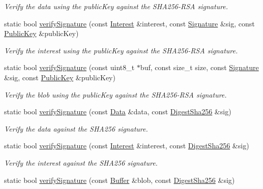 \begin{DoxyCompactItemize}
\begin{DoxyCompactList}\small\item\em Verify the data using the public\+Key against the S\+H\+A256-\/\+R\+SA signature. \end{DoxyCompactList}\item 
static bool \hyperlink{classndn_1_1Validator_a5faa99e68ab831c746ce0c2a2e239d80}{verify\+Signature} (const \hyperlink{classndn_1_1Interest}{Interest} \&interest, const \hyperlink{classndn_1_1Signature}{Signature} \&sig, const \hyperlink{classndn_1_1PublicKey}{Public\+Key} \&public\+Key)
\begin{DoxyCompactList}\small\item\em Verify the interest using the public\+Key against the S\+H\+A256-\/\+R\+SA signature. \end{DoxyCompactList}\item 
static bool \hyperlink{classndn_1_1Validator_a302755201b396a2454dd51099dd795a2}{verify\+Signature} (const uint8\+\_\+t $\ast$buf, const size\+\_\+t size, const \hyperlink{classndn_1_1Signature}{Signature} \&sig, const \hyperlink{classndn_1_1PublicKey}{Public\+Key} \&public\+Key)\hypertarget{classndn_1_1Validator_a302755201b396a2454dd51099dd795a2}{}\label{classndn_1_1Validator_a302755201b396a2454dd51099dd795a2}

\begin{DoxyCompactList}\small\item\em Verify the blob using the public\+Key against the S\+H\+A256-\/\+R\+SA signature. \end{DoxyCompactList}\item 
static bool \hyperlink{classndn_1_1Validator_a8fcd7839e9f422f891a813c7e2592f23}{verify\+Signature} (const \hyperlink{classndn_1_1Data}{Data} \&data, const \hyperlink{classndn_1_1DigestSha256}{Digest\+Sha256} \&sig)\hypertarget{classndn_1_1Validator_a8fcd7839e9f422f891a813c7e2592f23}{}\label{classndn_1_1Validator_a8fcd7839e9f422f891a813c7e2592f23}

\begin{DoxyCompactList}\small\item\em Verify the data against the S\+H\+A256 signature. \end{DoxyCompactList}\item 
static bool \hyperlink{classndn_1_1Validator_a54986839b53eb9bde1640fecd4d35e9a}{verify\+Signature} (const \hyperlink{classndn_1_1Interest}{Interest} \&interest, const \hyperlink{classndn_1_1DigestSha256}{Digest\+Sha256} \&sig)
\begin{DoxyCompactList}\small\item\em Verify the interest against the S\+H\+A256 signature. \end{DoxyCompactList}\item 
static bool \hyperlink{classndn_1_1Validator_a8956f877d89d1e1aa6baad7448937bcb}{verify\+Signature} (const \hyperlink{classndn_1_1Buffer}{Buffer} \&blob, const \hyperlink{classndn_1_1DigestSha256}{Digest\+Sha256} \&sig)\hypertarget{classndn_1_1Validator_a8956f877d89d1e1aa6baad7448937bcb}{}\label{classndn_1_1Validator_a8956f877d89d1e1aa6baad7448937bcb}


\end{DoxyCompactItemize}
